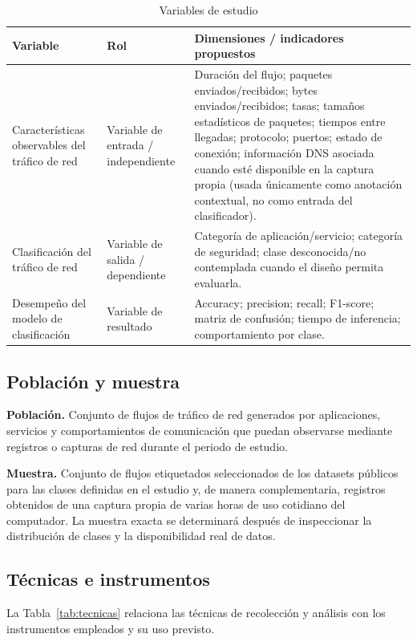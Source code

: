\documentclass[conference]{IEEEtran}
\begin{document}
\begin{table}[!t]
\centering
\caption{Variables de estudio}
\label{tab:variables}
\begin{tabular}{p{3.6cm}p{2.8cm}p{9.6cm}}
\toprule
\textbf{Variable} & \textbf{Rol} & \textbf{Dimensiones / indicadores propuestos} \\
\midrule
Características observables del tráfico de red & Variable de entrada / independiente & Duración del flujo; paquetes enviados/recibidos; bytes enviados/recibidos; tasas; tamaños estadísticos de paquetes; tiempos entre llegadas; protocolo; puertos; estado de conexión; información DNS asociada cuando esté disponible en la captura propia (usada únicamente como anotación contextual, no como entrada del clasificador). \\
Clasificación del tráfico de red & Variable de salida / dependiente & Categoría de aplicación/servicio; categoría de seguridad; clase desconocida/no contemplada cuando el diseño permita evaluarla. \\
Desempeño del modelo de clasificación & Variable de resultado & Accuracy; precision; recall; F1-score; matriz de confusión; tiempo de inferencia; comportamiento por clase. \\
\bottomrule
\end{tabular}
\end{table}

\subsection{Población y muestra}
\textbf{Población.} Conjunto de flujos de tráfico de red generados por aplicaciones, servicios y comportamientos de comunicación que puedan observarse mediante registros o capturas de red durante el periodo de estudio.

\textbf{Muestra.} Conjunto de flujos etiquetados seleccionados de los datasets públicos para las clases definidas en el estudio y, de manera complementaria, registros obtenidos de una captura propia de varias horas de uso cotidiano del computador. La muestra exacta se determinará después de inspeccionar la distribución de clases y la disponibilidad real de datos.

\subsection{Técnicas e instrumentos}

La Tabla~\ref{tab:tecnicas} relaciona las técnicas de recolección y análisis con los instrumentos empleados y su uso previsto.
\end{document}

